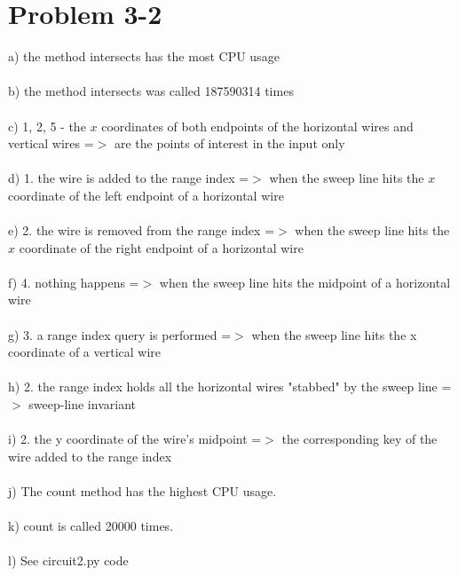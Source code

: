 \documentclass{article}
\begin{document}
\section{Problem 3-2}
a) the method intersects has the most CPU usage \\\\
b) the method intersects was called 187590314 times \\\\
c) 1, 2, 5 - the $x$ coordinates of both endpoints of the horizontal wires and vertical wires =$>$ are the points of interest in the input only \\\\
d) 1. the wire is added to the range index =$>$ when the sweep line hits the $x$ coordinate of the left endpoint of a horizontal wire \\\\
e) 2. the wire is removed from the range index =$>$ when the sweep line hits the $x$ coordinate of the right endpoint of a horizontal wire \\\\
f) 4. nothing happens =$>$ when the sweep line hits the midpoint of a horizontal wire \\\\
g) 3. a range index query is performed =$>$ when the sweep line hits the x coordinate of a vertical wire \\\\
h) 2. the range index holds all the horizontal wires "stabbed" by the sweep line =$>$ sweep-line invariant \\\\
i) 2. the y coordinate of the wire's midpoint =$>$ the corresponding key of the wire added to the range index \\\\
j) The count method has the highest CPU usage. \\\\
k) count is called 20000 times. \\\\
l) See circuit2.py code
\end{document}
